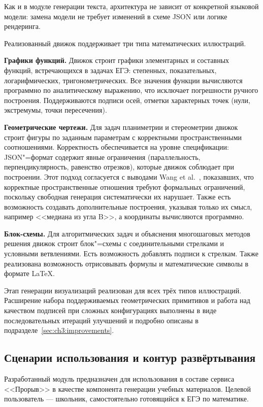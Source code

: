 Как и в модуле генерации текста, архитектура не зависит от конкретной языковой
модели: замена модели не требует изменений в схеме JSON или логике рендеринга.

Реализованный движок поддерживает три типа математических иллюстраций.

\textbf{Графики функций.} Движок строит графики элементарных и составных
функций, встречающихся в задачах ЕГЭ: степенных, показательных,
логарифмических, тригонометрических. Все значения функции вычисляются
программно по аналитическому выражению, что исключает погрешности ручного
построения. Поддерживаются подписи осей, отметки характерных точек (нули,
экстремумы, точки пересечения).

\textbf{Геометрические чертежи.} Для задач планиметрии и стереометрии
движок строит фигуры по заданным параметрам с корректными пространственными
соотношениями. Корректность обеспечивается на уровне спецификации:
JSON"=формат содержит явные ограничения (параллельность, перпендикулярность,
равенство отрезков), которые движок соблюдает при построении. Этот подход
согласуется с выводами Wang et al.~\cite{Wang2025MagicGeo}, показавших, что
корректные пространственные отношения требуют формальных ограничений,
поскольку свободная генерация систематически их нарушает. Также есть возможность создавать 
дополнительные построения, указывая только их смысл, например <<медиана из угла B>>, а координаты вычисляются программно. 

\textbf{Блок-схемы.} Для алгоритмических задач и объяснения многошаговых
методов решения движок строит блок"=схемы с соединительными стрелками и
условными ветвлениями. Есть возможность добавлять подписи к стрелкам. Также реализована возможность отрисовывать 
формулы и математические символы в формате LaTeX.

Этап генерации визуализаций реализован для всех трёх типов иллюстраций.
Расширение набора поддерживаемых геометрических примитивов и работа над
качеством подписей при сложных конфигурациях выполнены в виде
последовательных итераций улучшений и подробно описаны в
подразделе~\ref{sec:ch3:improvements}.

\subsection{Сценарии использования и контур развёртывания}

Разработанный модуль предназначен для использования в составе сервиса
<<Прорыв>> в качестве компонента генерации учебных материалов. Целевой
пользователь --- школьник, самостоятельно готовящийся к ЕГЭ по математике.

